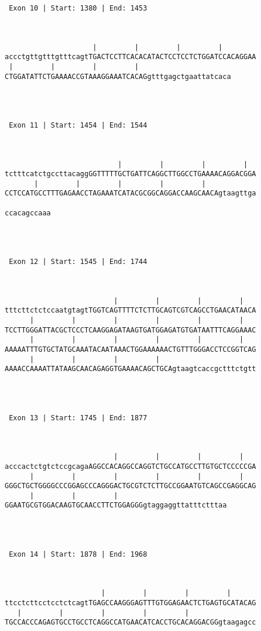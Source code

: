 \documentclass{article}
\begin{document}
\begin{Verbatim}
 Exon 10 | Start: 1380 | End: 1453 



                     |         |         |         |        
accctgttgtttgtttcagtTGACTCCTTCACACATACTCCTCCTCTGGATCCACAGGAA
 |         |         |         |                      
CTGGATATTCTGAAAACCGTAAAGGAAATCACAGgtttgagctgaattatcaca




 Exon 11 | Start: 1454 | End: 1544 



                           |         |         |         |  
tctttcatctgccttacaggGGTTTTTGCTGATTCAGGCTTGGCCTGAAAACAGGACGGA
       |         |         |         |         |            
CCTCCATGCCTTTGAGAACCTAGAAATCATACGCGGCAGGACCAAGCAACAgtaagttga
           
ccacagccaaa




 Exon 12 | Start: 1545 | End: 1744 



                          |         |         |         |   
tttcttctctccaatgtagtTGGTCAGTTTTCTCTTGCAGTCGTCAGCCTGAACATAACA
      |         |         |         |         |         |   
TCCTTGGGATTACGCTCCCTCAAGGAGATAAGTGATGGAGATGTGATAATTTCAGGAAAC
      |         |         |         |         |         |   
AAAAATTTGTGCTATGCAAATACAATAAACTGGAAAAAACTGTTTGGGACCTCCGGTCAG
      |         |         |         |                       
AAAACCAAAATTATAAGCAACAGAGGTGAAAACAGCTGCAgtaagtcaccgctttctgtt




 Exon 13 | Start: 1745 | End: 1877 



                          |         |         |         |   
acccactctgtctccgcagaAGGCCACAGGCCAGGTCTGCCATGCCTTGTGCTCCCCCGA
      |         |         |         |         |         |   
GGGCTGCTGGGGCCCGGAGCCCAGGGACTGCGTCTCTTGCCGGAATGTCAGCCGAGGCAG
      |         |         |                          
GGAATGCGTGGACAAGTGCAACCTTCTGGAGGGgtaggaggttatttctttaa




 Exon 14 | Start: 1878 | End: 1968 



                       |         |         |         |      
ttcctcttcctcctctcagtTGAGCCAAGGGAGTTTGTGGAGAACTCTGAGTGCATACAG
   |         |         |         |         |                
TGCCACCCAGAGTGCCTGCCTCAGGCCATGAACATCACCTGCACAGGACGGgtaagagcc
           

\end{Verbatim}
\end{document}
